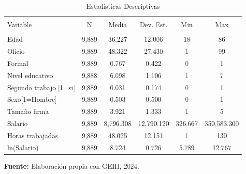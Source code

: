 \begin{table}[H] \centering 
  \caption{Estadísticas Descriptivas} 
  \label{} 
\begin{tabular}{@{\extracolsep{5pt}}lccccc} 
\\[-1.8ex]\hline 
\hline \\[-1.8ex] 
Variable & \multicolumn{1}{c}{N} & \multicolumn{1}{c}{Media} & \multicolumn{1}{c}{Dev. Est.} & \multicolumn{1}{c}{Min} & \multicolumn{1}{c}{Max} \\ 
\hline \\[-1.8ex] 
Edad & 9,889 & 36.227 & 12.006 & 18 & 86 \\ 
Oficio & 9,889 & 48.322 & 27.430 & 1 & 99 \\ 
Formal & 9,889 & 0.767 & 0.422 & 0 & 1 \\ 
Nivel educativo & 9,888 & 6.098 & 1.106 & 1 & 7 \\ 
Segundo trabajo [1=si] & 9,889 & 0.031 & 0.174 & 0 & 1 \\ 
Sexo[1=Hombre] & 9,889 & 0.503 & 0.500 & 0 & 1 \\ 
Tamaño firma & 9,889 & 3.921 & 1.333 & 1 & 5 \\ Salario & 9,889 & 8,796.308 & 12,790.120 & 326.667 & 350,583.300 \\ 
Horas trabajadas & 9,889 & 48.025 & 12.151 & 1 & 130 \\ 
ln(Salario) & 9,889 & 8.724 & 0.726 & 5.789 & 12.767 \\ 
\hline 
\hline\end{tabular} 
\begin{center}
    \footnotesize{\textbf{Fuente:} Elaboración propia con GEIH, 2024.}
\end{center}
\end{table} 

